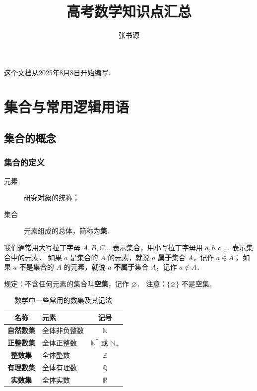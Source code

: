 \documentclass[a4paper,openany]{ctexbook}
\title{高考数学知识点汇总}
\author{张书源}
\begin{document}
\frontmatter
\maketitle
这个文档从2025年8月8日开始编写．
\tableofcontents

\mainmatter

\chapter{集合与常用逻辑用语} %

\section{集合的概念}

\subsection{集合的定义}

\begin{description}
    \item[元素] 研究对象的统称；
    \item[集合] 元素组成的总体，简称为\textbf{集}．
\end{description}

我们通常用大写拉丁字母 \(A,B,C\dots\) 表示集合，用小写拉丁字母用 \(a,b,c,\dots\) 表示集合中的元素．
如果 \(a\) 是集合的 \(A\) 的元素，就说 \(a\) \textbf{属于}集合 \(A\)，记作 \(a \in A\)；
如果 \(a\) 不是集合的 \(A\) 的元素，就说 \(a\) \textbf{不属于}集合 \(A\)，记作 \(a \not\in A\)．

规定：不含任何元素的集合叫\textbf{空集}，记作 \(\varnothing \)．
注意：\(\{\varnothing\}\) 不是空集．

\begin{table}
    \centering
    \begin{tabular}{>{\bfseries}clc}
        \toprule
        \textbf{名称} & \textbf{元素} & \textbf{记号}                        \\
        \midrule
        自然数集      & 全体非负整数  & \(\mathbb{N}\)                       \\
        正整数集      & 全体正整数    & \(\mathbb{N^*}\) 或 \(\mathbb{N_+}\) \\
        整数集        & 全体整数      & \(\mathbb{Z}\)                       \\
        有理数集      & 全体有理数    & \(\mathbb{Q}\)                       \\
        实数集        & 全体实数      & \(\mathbb{R}\)                       \\
        \bottomrule
    \end{tabular}
    \caption{数学中一些常用的数集及其记法}
\end{table}
\end{document}
